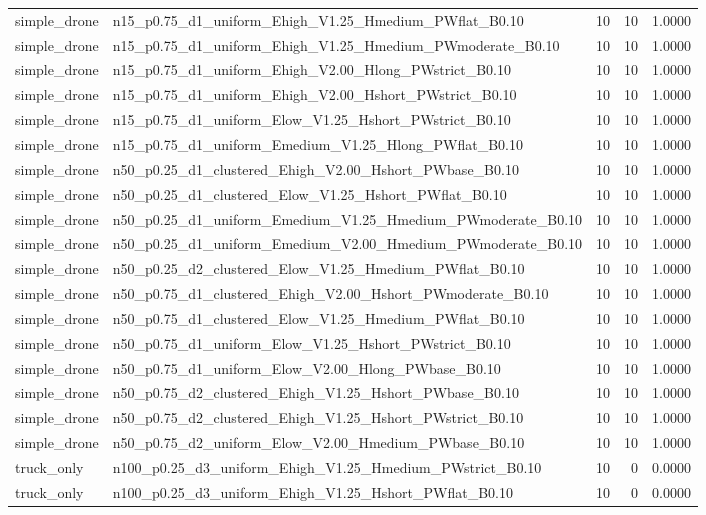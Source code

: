 \begin{tabular}{llrrr}
simple_drone & n15_p0.75_d1_uniform_Ehigh_V1.25_Hmedium_PWflat_B0.10 & 10 & 10 & 1.0000 \\
simple_drone & n15_p0.75_d1_uniform_Ehigh_V1.25_Hmedium_PWmoderate_B0.10 & 10 & 10 & 1.0000 \\
simple_drone & n15_p0.75_d1_uniform_Ehigh_V2.00_Hlong_PWstrict_B0.10 & 10 & 10 & 1.0000 \\
simple_drone & n15_p0.75_d1_uniform_Ehigh_V2.00_Hshort_PWstrict_B0.10 & 10 & 10 & 1.0000 \\
simple_drone & n15_p0.75_d1_uniform_Elow_V1.25_Hshort_PWstrict_B0.10 & 10 & 10 & 1.0000 \\
simple_drone & n15_p0.75_d1_uniform_Emedium_V1.25_Hlong_PWflat_B0.10 & 10 & 10 & 1.0000 \\
simple_drone & n50_p0.25_d1_clustered_Ehigh_V2.00_Hshort_PWbase_B0.10 & 10 & 10 & 1.0000 \\
simple_drone & n50_p0.25_d1_clustered_Elow_V1.25_Hshort_PWflat_B0.10 & 10 & 10 & 1.0000 \\
simple_drone & n50_p0.25_d1_uniform_Emedium_V1.25_Hmedium_PWmoderate_B0.10 & 10 & 10 & 1.0000 \\
simple_drone & n50_p0.25_d1_uniform_Emedium_V2.00_Hmedium_PWmoderate_B0.10 & 10 & 10 & 1.0000 \\
simple_drone & n50_p0.25_d2_clustered_Elow_V1.25_Hmedium_PWflat_B0.10 & 10 & 10 & 1.0000 \\
simple_drone & n50_p0.75_d1_clustered_Ehigh_V2.00_Hshort_PWmoderate_B0.10 & 10 & 10 & 1.0000 \\
simple_drone & n50_p0.75_d1_clustered_Elow_V1.25_Hmedium_PWflat_B0.10 & 10 & 10 & 1.0000 \\
simple_drone & n50_p0.75_d1_uniform_Elow_V1.25_Hshort_PWstrict_B0.10 & 10 & 10 & 1.0000 \\
simple_drone & n50_p0.75_d1_uniform_Elow_V2.00_Hlong_PWbase_B0.10 & 10 & 10 & 1.0000 \\
simple_drone & n50_p0.75_d2_clustered_Ehigh_V1.25_Hshort_PWbase_B0.10 & 10 & 10 & 1.0000 \\
simple_drone & n50_p0.75_d2_clustered_Ehigh_V1.25_Hshort_PWstrict_B0.10 & 10 & 10 & 1.0000 \\
simple_drone & n50_p0.75_d2_uniform_Elow_V2.00_Hmedium_PWbase_B0.10 & 10 & 10 & 1.0000 \\
truck_only & n100_p0.25_d3_uniform_Ehigh_V1.25_Hmedium_PWstrict_B0.10 & 10 & 0 & 0.0000 \\
truck_only & n100_p0.25_d3_uniform_Ehigh_V1.25_Hshort_PWflat_B0.10 & 10 & 0 & 0.0000 \\

\end{tabular}
